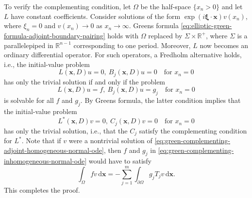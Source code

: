 \begin{Proof}
To verify the complementing condition, let $\Omega$ be the half-space $\{x_n>0\}$ and let $L$ have constant coefficients. Consider solutions of the form $\exp(i\bm{\xi}\cdot\bm{x})v(x_n)$, where $\xi_n=0$ and $v(x_n)\to0$ as $x_n\to\infty$. Green\textquotesingle s formula \eqref{eq:elliptic-green-formula-adjoint-boundary-pairing} holds with $\Omega$ replaced by $\Sigma\times\mathbb{R}^+$, where $\Sigma$ is a parallelepiped in $\mathbb{R}^{n-1}$ corresponding to one period. Moreover, $L$ now becomes an ordinary differential operator. For such operators, a Fredholm alternative holds, i.e., the initial-value problem
\begin{equation}\label{eq:green-complementing-homogeneous-normal-ode}
L(\bm{x},D)u=0,\ B_j(\bm{x},D)u=0\quad\text{for }x_n=0
\end{equation}
has only the trivial solution if and only if the problem
\begin{equation}\label{eq:green-complementing-inhomogeneous-normal-ode}
L(\bm{x},D)u=f,\ B_j(\bm{x},D)u=g_j\quad\text{for }x_n=0
\end{equation}
is solvable for all $f$ and $g_j$. By Green\textquotesingle s formula, the latter condition implies that the initial-value problem
\begin{equation}\label{eq:green-complementing-adjoint-homogeneous-normal-ode}
L^*(\bm{x},D)v=0,\ C_j(\bm{x},D)v=0\quad\text{for }x_n=0
\end{equation}
has only the trivial solution, i.e., that the $C_j$ satisfy the complementing condition for $L^*$. Note that if $v$ were a nontrivial solution of \eqref{eq:green-complementing-adjoint-homogeneous-normal-ode}, then $f$ and $g_j$ in \eqref{eq:green-complementing-inhomogeneous-normal-ode} would have to satisfy
\begin{equation}\label{eq:green-adjoint-mode-data-compatibility}
\int_\Omega fv\,\mathrm{d}\bm{x}=-\sum_{j=1}^m\int_{\partial\Omega}g_jT_jv\,\mathrm{d}\bm{x}.
\end{equation}
This completes the proof.
\end{Proof}
